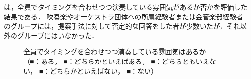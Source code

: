\newpage
\par
{}は，全員でタイミングを合わせつつ演奏している雰囲気があるか否かを評価した結果である．
吹奏楽やオーケストラ団体への所属経験者または金管楽器経験者のグループには，提案手法に対して否定的な回答をした者が少数いたが，それ以外のグループにはいなかった．
\begin{figure}[!h]
	\centering
	\hspace{5mm}
	\hspace{5mm}
	\caption{全員でタイミングを合わせつつ演奏している雰囲気はあるか\\
		（{\color{legend1}■}：ある，
		{\color{legend2}■}：どちらかといえばある，
		{\color{legend3}■}：どちらともいえない，
		{\color{legend4}■}：どちらかといえばない，
		{\color{legend5}■}：ない）}
	\label{fig:Q3-2}
\end{figure}
%
\vspace{5mm}

